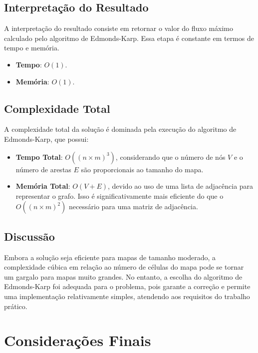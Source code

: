 \documentclass[a4paper,12pt]{article}
\begin{document}
\subsection*{Interpretação do Resultado}

A interpretação do resultado consiste em retornar o valor do fluxo máximo
calculado pelo algoritmo de Edmonds-Karp. Essa etapa é constante em termos de
tempo e memória.

\begin{itemize}
    \item \textbf{Tempo}: $O(1)$.
    \item \textbf{Memória}: $O(1)$.
\end{itemize}

\subsection*{Complexidade Total}

A complexidade total da solução é dominada pela execução do algoritmo de Edmonds-Karp, que possui:

\begin{itemize}
    \item \textbf{Tempo Total}: $O((n \times m)^3)$, considerando que o número de nós \(V\) e o número de arestas \(E\) são proporcionais ao tamanho do mapa.
    \item \textbf{Memória Total}: $O(V + E)$, devido ao uso de uma lista de adjacência para representar o grafo. Isso é significativamente mais eficiente do que o $O((n \times m)^2)$ necessário para uma matriz de adjacência.
\end{itemize}

\subsection*{Discussão}

Embora a solução seja eficiente para mapas de tamanho moderado, a complexidade
cúbica em relação ao número de células do mapa pode se tornar um gargalo para
mapas muito grandes. No entanto, a escolha do algoritmo de Edmonds-Karp foi
adequada para o problema, pois garante a correção e permite uma implementação
relativamente simples, atendendo aos requisitos do trabalho prático.

\section*{Considerações Finais}
\end{document}
